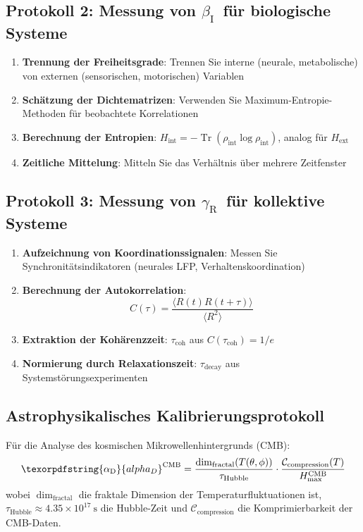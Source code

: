 \documentclass[12pt,a4paper]{article}
\DeclareMathOperator{\Tr}{Tr}
\DeclareRobustCommand{\alD}{\texorpdfstring{\ensuremath{\alpha_{\mathrm{D}}}}{alpha_D}}
\DeclareRobustCommand{\beI}{\texorpdfstring{\ensuremath{\beta_{\mathrm{I}}}}{beta_I}}
\DeclareRobustCommand{\gaR}{\texorpdfstring{\ensuremath{\gamma_{\mathrm{R}}}}{gamma_R}}
\begin{document}
	\subsection{Protokoll 2: Messung von \beI\ für biologische Systeme}
	
	\begin{enumerate}
		\item \textbf{Trennung der Freiheitsgrade}: Trennen Sie interne (neurale, metabolische) von externen (sensorischen, motorischen) Variablen
		\item \textbf{Schätzung der Dichtematrizen}: Verwenden Sie Maximum-Entropie-Methoden für beobachtete Korrelationen
		\item \textbf{Berechnung der Entropien}: \(H_{\mathrm{int}} = -\Tr(\rho_{\mathrm{int}}\log\rho_{\mathrm{int}})\), analog für \(H_{\mathrm{ext}}\)
		\item \textbf{Zeitliche Mittelung}: Mitteln Sie das Verhältnis über mehrere Zeitfenster
	\end{enumerate}
	
	\subsection{Protokoll 3: Messung von \gaR\ für kollektive Systeme}
	
	\begin{enumerate}
		\item \textbf{Aufzeichnung von Koordinationssignalen}: Messen Sie Synchronitätsindikatoren (neurales LFP, Verhaltenskoordination)
		\item \textbf{Berechnung der Autokorrelation}:
		\[
		C(\tau) = \frac{\langle R(t)R(t+\tau)\rangle}{\langle R^2\rangle}
		\]
		\item \textbf{Extraktion der Kohärenzzeit}: \(\tau_{\mathrm{coh}}\) aus \(C(\tau_{\mathrm{coh}}) = 1/e\)
		\item \textbf{Normierung durch Relaxationszeit}: \(\tau_{\mathrm{decay}}\) aus Systemstörungsexperimenten
	\end{enumerate}
	
	\subsection{Astrophysikalisches Kalibrierungsprotokoll}
	\label{subsec:astro-calibration}
	
	Für die Analyse des kosmischen Mikrowellenhintergrunds (CMB):
	\[
	\alD^{\mathrm{CMB}} = \frac{\dim_{\mathrm{fractal}}(T(\theta,\phi))}{\tau_{\mathrm{Hubble}}} \cdot \frac{\mathcal{C}_{\mathrm{compression}}(T)}{H_{\max}^{\mathrm{CMB}}}
	\]
	wobei \(\dim_{\mathrm{fractal}}\) die fraktale Dimension der Temperaturfluktuationen ist, \(\tau_{\mathrm{Hubble}} \approx 4.35 \times 10^{17}\ \mathrm{s}\) die Hubble-Zeit und \(\mathcal{C}_{\mathrm{compression}}\) die Komprimierbarkeit der CMB-Daten.
	
\end{document}
